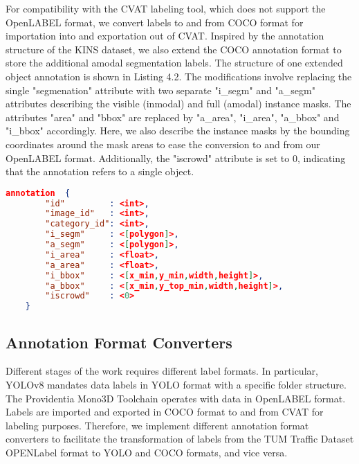 For compatibility with the CVAT labeling tool, which does not support the OpenLABEL format, we convert labels to and from COCO format for importation into and exportation out of CVAT. Inspired by the annotation structure of the KINS dataset, we also extend the COCO annotation format to store the additional amodal segmentation labels. The structure of one extended object annotation is shown in Listing 4.2. The modifications involve replacing the single "segmenation" attribute with two separate "i\_segm" and "a\_segm" attributes describing the visible (inmodal) and full (amodal) instance masks. The attributes "area" and "bbox" are replaced by "a\_area", "i\_area", "a\_bbox" and "i\_bbox" accordingly. Here, we also describe the instance masks by the bounding coordinates around the mask areas to ease the conversion to and from our OpenLABEL format. Additionally, the "iscrowd" attribute is set to 0, indicating that the annotation refers to a single object.

\begin{lstlisting}[language=json, caption={Illutration of the extended COCO Annotation JSON Structure}, keepspaces=true] 
	annotation  {
		"id"         : <int>, 
		"image_id"   : <int>, 
		"category_id": <int>, 
		"i_segm"     : <[polygon]>, 
		"a_segm"     : <[polygon]>, 
		"i_area"     : <float>, 
		"a_area"     : <float>, 
		"i_bbox"     : <[x_min,y_min,width,height]>, 
		"a_bbox"     : <[x_min,y_top_min,width,height]>, 
		"iscrowd"    : <0> 
	}
\end{lstlisting}

\subsection{Annotation Format Converters}  \label{sec:format_converters}

Different stages of the work requires different label formats. In particular, YOLOv8 mandates data labels in YOLO format with a specific folder structure. The Providentia Mono3D Toolchain operates with data in OpenLABEL format. Labels are imported and exported in COCO format to and from CVAT for labeling purposes. Therefore, we implement different annotation format converters to facilitate the transformation of labels from the TUM Traffic Dataset OPENLabel format to YOLO and COCO formats, and vice versa.

